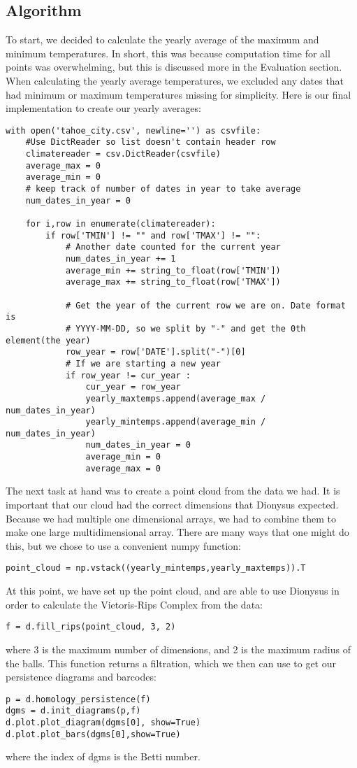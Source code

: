 \documentclass[12pt]{report}
\begin{document}
\subsection*{Algorithm}
To start, we decided to calculate the yearly average of the maximum and minimum temperatures. In short, this was because computation time for all points was overwhelming, but this is discussed more in the Evaluation section. When calculating the yearly average temperatures, we excluded any dates that had minimum or maximum temperatures missing for simplicity. Here is our final implementation to create our yearly averages:
\begin{lstlisting}
with open('tahoe_city.csv', newline='') as csvfile:
    #Use DictReader so list doesn't contain header row 
    climatereader = csv.DictReader(csvfile)
    average_max = 0
    average_min = 0
    # keep track of number of dates in year to take average
    num_dates_in_year = 0

    for i,row in enumerate(climatereader):
        if row['TMIN'] != "" and row['TMAX'] != "":
            # Another date counted for the current year
            num_dates_in_year += 1
            average_min += string_to_float(row['TMIN'])
            average_max += string_to_float(row['TMAX'])

            # Get the year of the current row we are on. Date format is 
            # YYYY-MM-DD, so we split by "-" and get the 0th element(the year)
            row_year = row['DATE'].split("-")[0]
            # If we are starting a new year
            if row_year != cur_year :
                cur_year = row_year
                yearly_maxtemps.append(average_max / num_dates_in_year)
                yearly_mintemps.append(average_min / num_dates_in_year)
                num_dates_in_year = 0
                average_min = 0
                average_max = 0
\end{lstlisting}
The next task at hand was to create a point cloud from the data we had. It is important that our cloud had the correct dimensions that Dionysus expected. Because we had multiple one dimensional arrays, we had to combine them to make one large multidimensional array. There are many ways that one might do this, but we chose to use a convenient numpy function:
\begin{lstlisting}
point_cloud = np.vstack((yearly_mintemps,yearly_maxtemps)).T
\end{lstlisting}
At this point, we have set up the point cloud, and are able to use Dionysus in order to calculate the Vietoris-Rips Complex from the data:
\begin{lstlisting}
f = d.fill_rips(point_cloud, 3, 2)
\end{lstlisting}
where 3 is the maximum number of dimensions, and 2 is the maximum radius of the balls.
This function returns a filtration, which we then can use to get our persistence diagrams and barcodes:
\begin{lstlisting}
p = d.homology_persistence(f)
dgms = d.init_diagrams(p,f)
d.plot.plot_diagram(dgms[0], show=True)
d.plot.plot_bars(dgms[0],show=True)
\end{lstlisting}
where the index of dgms is the Betti number. \par
\end{document}
